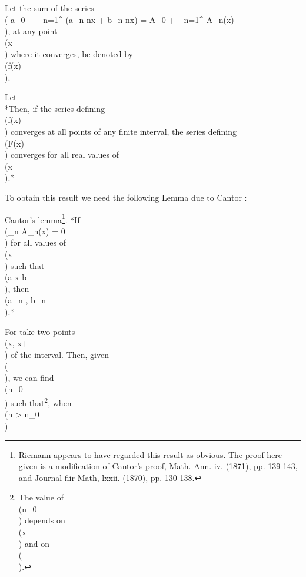 Let the sum of the series
\\( a_{0} + \sum_{n=1}^{\infty} (a_{n} \cos nx + b_{n} \sin nx)
=
A_{0} + \sum_{n=1}^{\infty} A_{n}(x)\\),
at any point \\(x\\) where it converges, be denoted by \\(f(x)\\).

Let
\\[ 
F(x) = \frac{1}{2} A_{0} x^{2} - \sum_{n=1}^{\infty} n^{-2} A_{n}(x).
\\] 

*Then, if the series defining \\(f(x)\\) converges at all points of any
finite interval, the series defining \\(F(x)\\) converges for all real
values of \\(x\\).*

To obtain this result we need the following Lemma due to Cantor :

Cantor's lemma\footnote{Riemann appears to have regarded this result as obvious.
  The proof here given is a modification of Cantor's proof,
  Math. Ann. iv. (1871), pp. 139-143, and Journal fiir Math, lxxii. (1870), pp. 130-138.}.%
*If \\(\lim_{n \rightarrow \infty} A_{n}(x) = 0\\) for all values of \\(x\\) such that \\(a \leq x \leq b\\),
then \\(a_{n} , b_{n} \\).*

For take two points \\(x, x+\delta\\) of the interval. Then, given \\(\eps\\), we can
find \\(n_{0}\\) such that\footnote{The value of \\(n_{0}\\) depends on \\(x\\) and on \\(\delta\\).},
when \\(n > n_{0}\\)
\\[ 
\left| \, 
  a_{n} \cos nx + b_{n} \sin nx
 \, \right| 
<
\eps,
\quad
\left| \, 
  a_{n} \cos n(x+\delta) + b_{n} \sin n(x+\delta)
 \, \right| 
<
\eps.
\\] 

